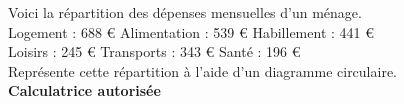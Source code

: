 %
%
	Voici la répartition des dépenses mensuelles d'un ménage. \\
	Logement : 688 € \hfill Alimentation : 539 € \hfill Habillement : 441 € \\
	Loisirs : 245 € \hfill Transports : 343 € \hfill Santé : 196 € \\

	Représente cette répartition à l'aide d'un diagramme circulaire. \\
	\textbf{Calculatrice autorisée}
